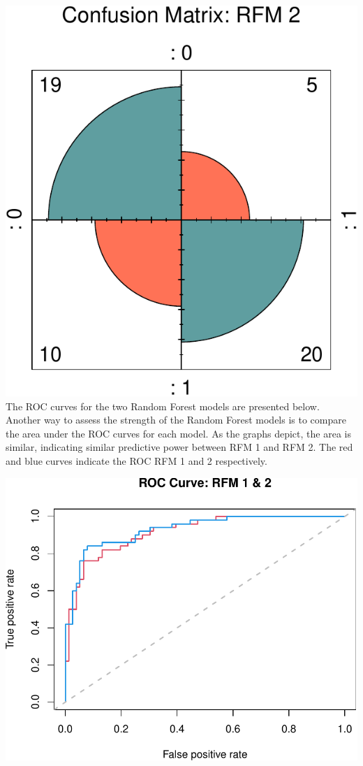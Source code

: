 \documentclass[11pt,preprint, authoryear]{elsarticle}
\numberwithin{equation}{section}
\numberwithin{figure}{section}
\numberwithin{table}{section}
\begin{document}
\includegraphics{ML_project_files/figure-latex/unnamed-chunk-11-1.pdf}
\newpage The ROC curves for the two Random Forest models are presented
below. Another way to assess the strength of the Random Forest models is
to compare the area under the ROC curves for each model. As the graphs
depict, the area is similar, indicating similar predictive power between
RFM 1 and RFM 2. The red and blue curves indicate the ROC RFM 1 and 2
respectively.

\includegraphics{ML_project_files/figure-latex/unnamed-chunk-12-1.pdf}
\end{document}
